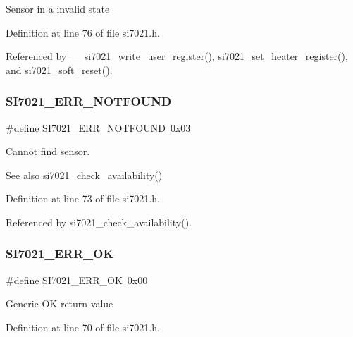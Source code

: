 Sensor in a invalid state 

Definition at line 76 of file si7021.\+h.



Referenced by \+\_\+\+\_\+si7021\+\_\+write\+\_\+user\+\_\+register(), si7021\+\_\+set\+\_\+heater\+\_\+register(), and si7021\+\_\+soft\+\_\+reset().

\mbox{\label{group__SI7021__RT__VALUE_ga277249c1e2c9ac97e4bec42c79ad4e49}} 
\subsubsection{\texorpdfstring{S\+I7021\+\_\+\+E\+R\+R\+\_\+\+N\+O\+T\+F\+O\+U\+ND}{SI7021\_ERR\_NOTFOUND}}
{\footnotesize\ttfamily \#define S\+I7021\+\_\+\+E\+R\+R\+\_\+\+N\+O\+T\+F\+O\+U\+ND~0x03}

Cannot find sensor. \begin{DoxySeeAlso}{See also}
\hyperlink{si7021_8h_a17554408b2bda4f9219d479946e30fbb}{si7021\+\_\+check\+\_\+availability()} 
\end{DoxySeeAlso}


Definition at line 73 of file si7021.\+h.



Referenced by si7021\+\_\+check\+\_\+availability().

\mbox{\label{group__SI7021__RT__VALUE_ga04cef12730209bc72277b64111308b42}} 
\subsubsection{\texorpdfstring{S\+I7021\+\_\+\+E\+R\+R\+\_\+\+OK}{SI7021\_ERR\_OK}}
{\footnotesize\ttfamily \#define S\+I7021\+\_\+\+E\+R\+R\+\_\+\+OK~0x00}

Generic OK return value 

Definition at line 70 of file si7021.\+h.



